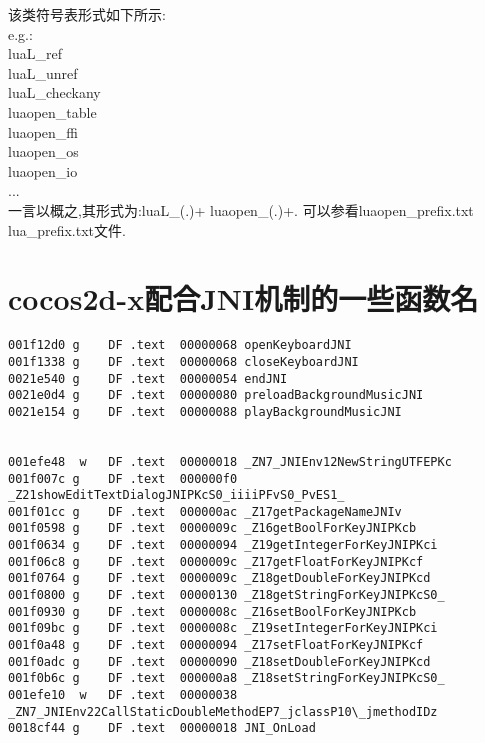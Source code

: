 该类符号表形式如下所示:\\
e.g.:\\
	luaL\_ref\\
	luaL\_unref\\
	luaL\_checkany\\
	luaopen\_table\\
	luaopen\_ffi\\
	luaopen\_os\\
	luaopen\_io\\
	...\\
一言以概之,其形式为:luaL\_(.)+ luaopen\_(.)+.
可以参看luaopen\_prefix.txt  lua\_prefix.txt文件.

\section{cocos2d-x配合JNI机制的一些函数名}

\begin{lstlisting}
001f12d0 g    DF .text  00000068 openKeyboardJNI
001f1338 g    DF .text  00000068 closeKeyboardJNI
0021e540 g    DF .text  00000054 endJNI
0021e0d4 g    DF .text  00000080 preloadBackgroundMusicJNI
0021e154 g    DF .text  00000088 playBackgroundMusicJNI


001efe48  w   DF .text  00000018 _ZN7_JNIEnv12NewStringUTFEPKc
001f007c g    DF .text  000000f0 _Z21showEditTextDialogJNIPKcS0_iiiiPFvS0_PvES1_
001f01cc g    DF .text  000000ac _Z17getPackageNameJNIv
001f0598 g    DF .text  0000009c _Z16getBoolForKeyJNIPKcb
001f0634 g    DF .text  00000094 _Z19getIntegerForKeyJNIPKci
001f06c8 g    DF .text  0000009c _Z17getFloatForKeyJNIPKcf
001f0764 g    DF .text  0000009c _Z18getDoubleForKeyJNIPKcd
001f0800 g    DF .text  00000130 _Z18getStringForKeyJNIPKcS0_
001f0930 g    DF .text  0000008c _Z16setBoolForKeyJNIPKcb
001f09bc g    DF .text  0000008c _Z19setIntegerForKeyJNIPKci
001f0a48 g    DF .text  00000094 _Z17setFloatForKeyJNIPKcf
001f0adc g    DF .text  00000090 _Z18setDoubleForKeyJNIPKcd
001f0b6c g    DF .text  000000a8 _Z18setStringForKeyJNIPKcS0_
001efe10  w   DF .text  00000038 _ZN7_JNIEnv22CallStaticDoubleMethodEP7_jclassP10\_jmethodIDz
0018cf44 g    DF .text  00000018 JNI_OnLoad
\end{lstlisting}

